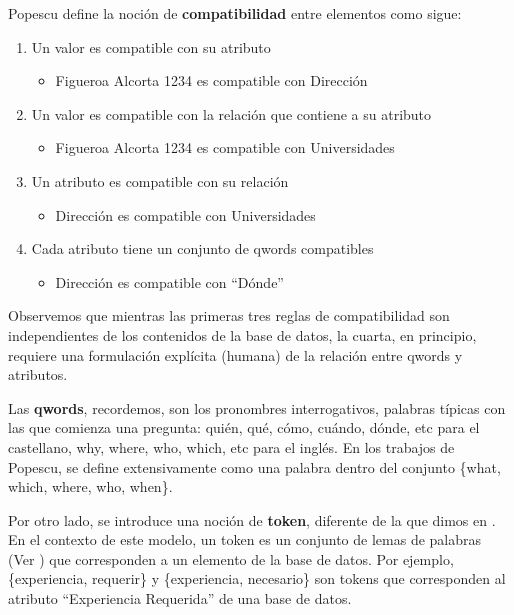 Popescu define la noción de \textbf{compatibilidad} entre elementos como sigue:
\begin{enumerate}
  \item Un valor es compatible con su atributo
  \begin{itemize}
      \item Figueroa Alcorta 1234 es compatible con Dirección
  \end{itemize}
  \item Un valor es compatible con la relación que contiene a su atributo
  \begin{itemize}
    \item Figueroa Alcorta 1234 es compatible con Universidades
  \end{itemize}
  \item Un atributo es compatible con su relación
  \begin{itemize}
      \item Dirección es compatible con Universidades
  \end{itemize}
  \item Cada atributo tiene un conjunto de qwords compatibles
  \begin{itemize}
    \item Dirección es compatible con “Dónde”
  \end{itemize}
\end{enumerate}

Observemos que mientras las primeras tres reglas de compatibilidad son independientes de los contenidos de la base de datos, la cuarta, en principio, requiere una formulación explícita (humana) de la relación entre qwords y atributos.

Las \textbf{qwords}, recordemos, son los pronombres interrogativos, palabras típicas con las que comienza una pregunta: quién, qué, cómo, cuándo, dónde, etc para el castellano, why, where, who, which, etc para el inglés. En los trabajos de Popescu, se define extensivamente como una palabra dentro del conjunto \{what, which, where, who, when\}.

Por otro lado, se introduce una noción de \textbf{token}, diferente de la que dimos en .
En el contexto de este modelo, un token es un conjunto de lemas de palabras (Ver ) que corresponden a un elemento de la base de datos. Por ejemplo, \{experiencia, requerir\} y \{experiencia, necesario\} son tokens que corresponden al atributo “Experiencia Requerida” de una base de datos.


